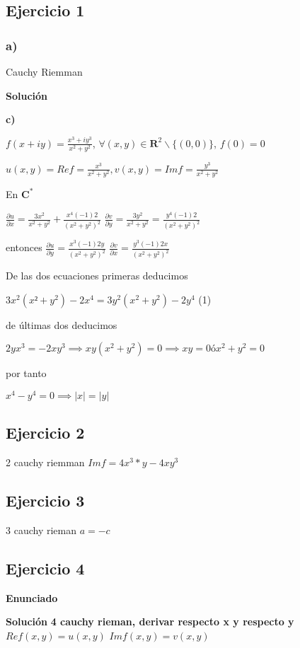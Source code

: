 \subsection{Ejercicio 1}
\subsubsection{a)}
Cauchy Riemman

\textbf{Solución}


\textbf{c)}

$f(x+iy) = \frac{x^3+iy^3}{x^2+y^2}$, $\forall (x,y)\in\mathbf{R}^2 \backslash \{ (0,0) \}$, $f(0)=0$

$u(x,y) = Re f = \frac{x^3}{x^2+y^2}, v(x,y) = Imf = \frac{y^3}{x^2+y^2}$

En $\mathbf{C}^{\ast}$

$ \frac{\partial u}{\partial x} = \frac{3x^2}{x^2+y^2} + \frac{x^4(-1)2}{(x^2+y^2)^2}$
$ \frac{\partial v}{\partial y} = \frac{3y^2}{x^2+y^2} = \frac{y^4(-1)2}{(x^2+y^2)^2}$

entonces
$\frac{\partial u}{\partial y} = \frac{x^3 (-1)2y}{(x^2+y^2)^2}$
$\frac{\partial v}{\partial x} = \frac{y^3(-1)2x}{(x^2+y^2)^2}$

De las dos ecuaciones primeras deducimos

$3x^2(x²+y^2) - 2x^4 = 3y^2(x^2+y^2)-2y^4$  (1)

de últimas dos deducimos

$2yx^3=-2xy^3 \implies xy(x^2+y^2) = 0 \implies xy=0 ó x^2+y^2=0$

por tanto

$x^4-y^4 = 0 \implies |x|=|y|$



\subsection{Ejercicio 2}
2 cauchy riemman
$Imf = 4x^3*y - 4xy^3$

\subsection{Ejercicio 3}
3 cauchy rieman
$a=-c$


\subsection{Ejercicio 4}
\textbf{Enunciado}


\textbf{Solución}
\textbf{4 cauchy rieman, derivar respecto x y respecto y}
$Ref (x,y) = u(x,y)$ $Imf(x,y) = v(x,y)$

